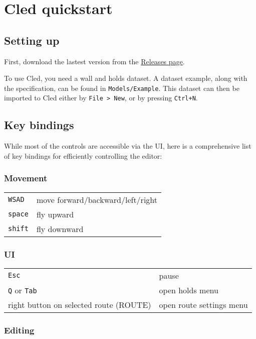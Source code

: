 \chapter{Cled quickstart}\label{apx:cled}

\section{Setting up}
First, download the lastest version from the \href{https://github.com/Climber-Tools/Cled/releases}{Releases page}.

To use Cled, you need a wall and holds dataset. A dataset example, along with the specification, can be found in \verb|Models/Example|.
This dataset can then be imported to Cled either by \verb|File > New|, or by pressing
\verb|Ctrl+N|.

\section{Key bindings}

While most of the controls are accessible via the UI, here is a comprehensive list of key bindings for efficiently controlling the editor:

\subsection{Movement}

\begin{tabular}[]{@{}ll@{}}
\toprule
\verb|WSAD| & move forward/backward/left/right \\
\verb|space| & fly upward \\
\verb|shift| & fly downward \\
\bottomrule
\end{tabular}

\subsection{UI}

\begin{tabular}[]{@{}ll@{}}
\toprule
\verb|Esc| & pause \\
\verb|Q| or \verb|Tab| & open holds menu \\
right button on selected route (ROUTE) & open route settings menu \\
\bottomrule
\end{tabular}

\subsection{Editing}

